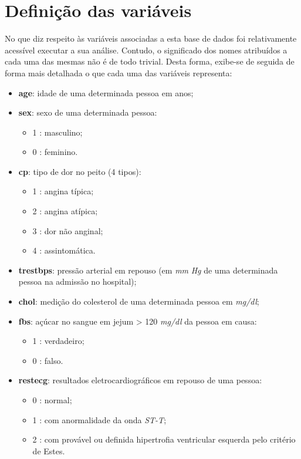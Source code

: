 \documentclass[a4paper]{report}
\begin{document}
{	\section{Definição das variáveis}
	No que diz respeito às variáveis associadas a esta base de dados foi relativamente acessível executar a sua análise. Contudo, o significado dos nomes atribuídos a cada uma das mesmas 
	não é de todo trivial. Desta forma, exibe-se de seguida de forma mais detalhada o que cada uma das variáveis representa:
    \begin{itemize}
	    \item \textbf{age}: idade de uma determinada pessoa em anos;
		\item \textbf{sex}: sexo de uma determinada pessoa:
		\begin{itemize}
			\item 1 : masculino;
			\item 0 : feminino.
		\end{itemize}
	    \item \textbf{cp}: tipo de dor no peito (4 tipos):
	    \begin{itemize}
			\item 1 : angina típica;
			\item 2 : angina atípica;
			\item 3 : dor não anginal;
			\item 4 : assintomática.
		\end{itemize}
	    \item \textbf{trestbps}: pressão arterial em repouso (em \textit{mm} \textit{Hg} de uma determinada pessoa na admissão no hospital);
	    \item \textbf{chol}: medição do colesterol de uma determinada pessoa em \textit{mg/dl};
		\item \textbf{fbs}: açúcar no sangue em jejum > 120 \textit{mg/dl} da pessoa em causa:
		\begin{itemize}
			\item 1 : verdadeiro;
			\item 0 : falso.
		\end{itemize}
	    \item \textbf{restecg}: resultados eletrocardiográficos em repouso de uma pessoa:
	    \begin{itemize}
			\item 0 : normal;
			\item 1 : com anormalidade da onda \textit{ST-T};
			\item 2 : com provável ou definida hipertrofia ventricular esquerda pelo critério de Estes.

\end{itemize}
\end{itemize}}
\end{document}
